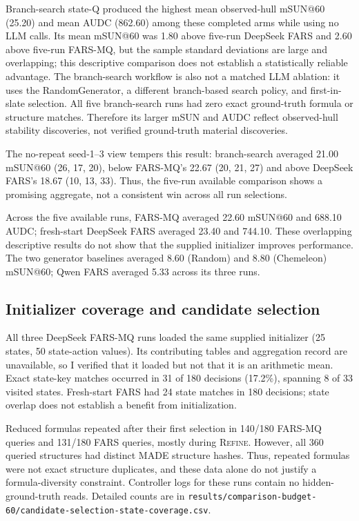 \documentclass[11pt,a4paper]{article}
\begin{document}
Branch-search state-Q produced the highest mean observed-hull mSUN@60
(25.20) and mean AUDC (862.60) among these completed arms while using no
LLM calls. Its mean mSUN@60 was 1.80 above five-run DeepSeek FARS and 2.60
above five-run FARS-MQ, but the sample standard deviations are large and
overlapping; this descriptive comparison does not establish a statistically
reliable advantage. The branch-search workflow is also not a matched LLM
ablation: it uses the RandomGenerator, a different branch-based search
policy, and first-in-slate selection. All five branch-search runs had zero
exact ground-truth formula or structure matches. Therefore its larger mSUN
and AUDC reflect observed-hull stability discoveries, not verified
ground-truth material discoveries.

The no-repeat seed-1--3 view tempers this result: branch-search averaged
21.00 mSUN@60 (26, 17, 20), below FARS-MQ's 22.67 (20, 21, 27) and above
DeepSeek FARS's 18.67 (10, 13, 33). Thus, the five-run available comparison
shows a promising aggregate, not a consistent win across all run
selections.

Across the five available runs, FARS-MQ averaged 22.60 mSUN@60 and 688.10
AUDC; fresh-start DeepSeek FARS averaged 23.40 and 744.10. These overlapping
descriptive results do not show that the supplied initializer improves
performance. The two generator baselines averaged 8.60 (Random) and 8.80
(Chemeleon) mSUN@60; Qwen FARS averaged 5.33 across its three runs.

\subsection{Initializer coverage and candidate selection}
All three DeepSeek FARS-MQ runs loaded the same supplied initializer (25
states, 50 state-action values). Its contributing tables and aggregation
record are unavailable, so I verified that it loaded but not that it is an
arithmetic mean. Exact state-key matches occurred in 31 of 180 decisions
(17.2\%), spanning 8 of 33 visited states. Fresh-start FARS had 24 state
matches in 180 decisions; state overlap does not establish a benefit from
initialization.

Reduced formulas repeated after their first selection in 140/180 FARS-MQ
queries and 131/180 FARS queries, mostly during \textsc{Refine}. However,
all 360 queried structures had distinct MADE structure hashes. Thus,
repeated formulas were not exact structure duplicates, and these data alone
do not justify a formula-diversity constraint. Controller logs for these
runs contain no hidden-ground-truth reads. Detailed counts are in
\texttt{results/comparison-budget-60/candidate-selection-state-coverage.csv}.
\end{document}
